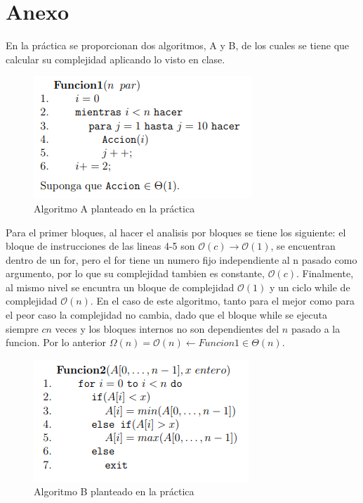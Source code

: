 \documentclass[12pt,twoside]{article}
\begin{document}
\section{Anexo}
En la pr\'actica se proporcionan dos algoritmos, A y B, de los cuales se tiene que calcular su complejidad aplicando lo visto en clase.
\begin{figure}[ht]
    \centering
    \includegraphics{anexo_uno.png}
    \caption{Algoritmo A planteado en la pr\'actica}
    \label{fig:algoritmo_a}
\end{figure}
Para el primer bloques, al hacer el analisis por bloques se tiene los siguiente: el bloque de instrucciones de las lineas 4-5 son $\mathcal{O}(c) \longrightarrow  \mathcal{O}(1)$, se encuentran dentro de un for, pero el for tiene un numero fijo independiente al n pasado como argumento, por lo que su complejidad tambien es constante, $\mathcal{O}(c)$. Finalmente, al mismo nivel se encuntra un bloque de complejidad $\mathcal{O}(1)$ y un ciclo while de complejidad $\mathcal{O}(n)$. En el caso de este algoritmo, tanto para el mejor como para el peor caso la complejidad no cambia, dado que el bloque while se ejecuta siempre $cn$ veces y los bloques internos no son dependientes del $n$ pasado a la funcion. Por lo anterior $\Omega (n) = \mathcal{O}(n)  \longleftarrow  Funcion1 \in \Theta(n)$.

\begin{figure}[ht]
    \centering
    \includegraphics{anexo_dos.png}
    \caption{Algoritmo B planteado en la pr\'actica}
    \label{fig:algoritmo_b}
\end{figure}
\end{document}
